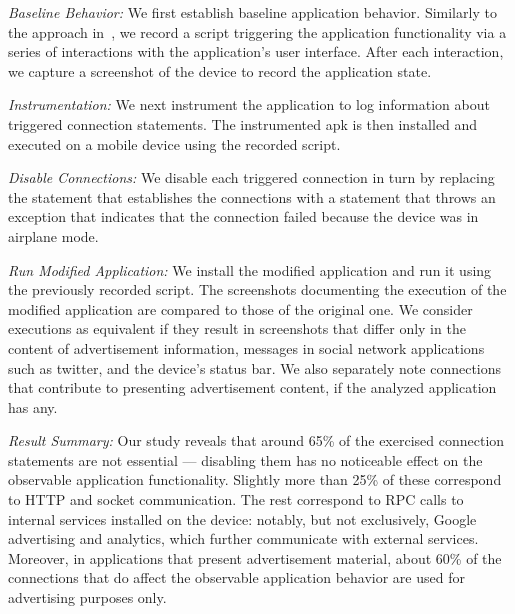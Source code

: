\vspace{0.05in}
\noindent\emph{Baseline Behavior:} We first establish baseline
application behavior.  Similarly to the approach
in~\cite{Hornyack:Han:Jung:Schechter:Wetherall:CCS11}, we record a
script triggering the application functionality via a series of
interactions with the application's user interface.  After each
interaction, we capture a screenshot of the device to record the
application state.

\vspace{0.05in}
\noindent\emph{Instrumentation:} We next instrument the application to log information
about triggered connection statements. The instrumented apk is then
installed and executed on a mobile device using the recorded script.

\vspace{0.05in}
\noindent\emph{Disable Connections:} We disable each triggered connection
in turn by replacing the statement that establishes the connections 
with a statement that throws an exception that indicates that the
connection failed because the device was in airplane mode. 

\vspace{0.05in}
\noindent\emph{Run Modified Application:} We install the modified
application and run it using the previously recorded script. The
screenshots documenting the execution of the modified application are
compared to those of the original one. We consider executions as
equivalent if they result in screenshots that differ only in the
content of advertisement information, messages in social network
applications such as twitter, and the device's status bar.  We also
separately note connections that contribute to presenting
advertisement content, if the analyzed application has any.

\vspace{0.05in}
\noindent\emph{Result Summary:} Our study reveals that around 65\% of
the exercised connection statements are not essential --- disabling
them has no noticeable effect on the observable application
functionality.  Slightly more than 25\% of these correspond to HTTP
and socket communication. The rest correspond to RPC calls to internal
services installed on the device: notably, but not exclusively, Google
advertising and analytics, which further communicate with external
services.  Moreover, in applications that present advertisement
material, about 60\% of the connections that do affect the observable
application behavior are used for advertising purposes only.

